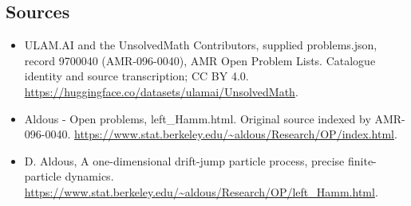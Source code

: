 \documentclass[11pt,a4paper]{article}
\begin{document}
\subsection{Sources}
\begin{itemize}
\item[S1] ULAM.AI and the UnsolvedMath Contributors, supplied problems.json, record 9700040 (AMR-096-0040), AMR Open Problem Lists. Catalogue identity and source transcription; CC BY 4.0.
\url{https://huggingface.co/datasets/ulamai/UnsolvedMath}.
\item[S2] Aldous - Open problems, left\_Hamm.html. Original source indexed by AMR-096-0040.
\url{https://www.stat.berkeley.edu/~aldous/Research/OP/index.html}.
\item[S3] D. Aldous, A one-dimensional drift-jump particle process, precise finite-particle dynamics.
\url{https://www.stat.berkeley.edu/~aldous/Research/OP/left_Hamm.html}.
\end{itemize}
\end{document}

